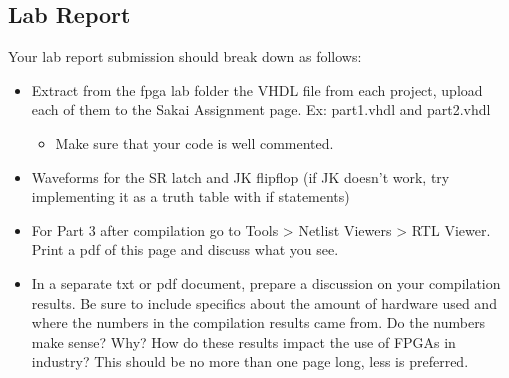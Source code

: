 \subsection{Lab Report}
Your lab report submission should break down as follows:
\begin{itemize}
	\item Extract from the fpga lab folder the VHDL file from each project, upload each of them to the Sakai Assignment page. Ex: part1.vhdl and part2.vhdl
	\begin{itemize}
		\item Make sure that your code is well commented.
	\end{itemize}
	\item Waveforms for the SR latch and JK flipflop (if JK doesn't work, try implementing it as a truth table with if statements)
	\item For Part 3 after compilation go to Tools > Netlist Viewers > RTL Viewer. Print a pdf of this page and discuss what you see.
	\item In a separate txt or pdf document, prepare a discussion on your compilation results. Be sure to include specifics about the amount of hardware used and where the numbers in the compilation results came from. Do the numbers make sense? Why? How do these results impact the use of FPGAs in industry? This should be no more than one page long, less is preferred.
\end{itemize}